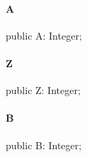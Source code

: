 \documentclass{report}
\begin{document}
\paragraph*{A}\hspace*{\fill}

\begin{list}{}{
\setlength{\itemindent}{0cm}
\setlength{\listparindent}{0cm}
\setlength{\leftmargin}{\evensidemargin}
\addtolength{\leftmargin}{\tmplength}
\settowidth{\labelsep}{X}
\addtolength{\leftmargin}{\labelsep}
\setlength{\labelwidth}{\tmplength}
}
\begin{flushleft}
\item[\textbf{Declaration}\hfill]
\begin{ttfamily}
public A: Integer;\end{ttfamily}


\end{flushleft}
\end{list}
\paragraph*{Z}\hspace*{\fill}

\begin{list}{}{
\setlength{\itemindent}{0cm}
\setlength{\listparindent}{0cm}
\setlength{\leftmargin}{\evensidemargin}
\addtolength{\leftmargin}{\tmplength}
\settowidth{\labelsep}{X}
\addtolength{\leftmargin}{\labelsep}
\setlength{\labelwidth}{\tmplength}
}
\begin{flushleft}
\item[\textbf{Declaration}\hfill]
\begin{ttfamily}
public Z: Integer;\end{ttfamily}


\end{flushleft}
\end{list}
\paragraph*{B}\hspace*{\fill}

\begin{list}{}{
\setlength{\itemindent}{0cm}
\setlength{\listparindent}{0cm}
\setlength{\leftmargin}{\evensidemargin}
\addtolength{\leftmargin}{\tmplength}
\settowidth{\labelsep}{X}
\addtolength{\leftmargin}{\labelsep}
\setlength{\labelwidth}{\tmplength}
}
\begin{flushleft}
\item[\textbf{Declaration}\hfill]
\begin{ttfamily}
public B: Integer;\end{ttfamily}


\end{flushleft}
\end{list}
\end{document}
